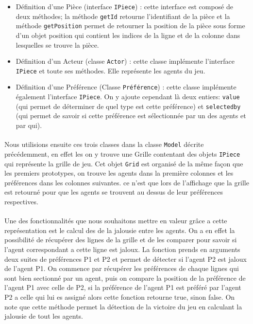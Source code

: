 \documentclass[../main.tex]{subfiles}
\begin{document}
\begin{itemize}
\item Définition d'une Pièce (interface \texttt{IPiece}) : cette interface est composé de deux méthodes; la méthode \texttt{getId} retourne l'identifiant de la pièce et la méthode \texttt{getPosition} permet de retourner la position de la pièce sous forme d'un objet position qui contient les indices de la ligne et de la colonne dans lesquelles se trouve la pièce.
\item Définition d'un Acteur (classe \texttt{Actor}) : cette classe implémente l'interface \texttt{IPiece} et toute ses méthodes. Elle représente les agents du jeu.                                                                                                                                                                                                                                                                                                                                      
\item Définition d'une Préférence (Classe \texttt{Préférence}) : cette classe implémente également l’interface \texttt{IPiece}. On y ajoute cependant là deux entiers: \texttt{value} (qui permet de déterminer de quel type est cette préférence) et \texttt{selectedby} (qui permet de savoir si cette préférence est sélectionnée par un des agents et par qui). 
\end{itemize}

\paragraph{}
Nous utilisions ensuite ces trois classes dans la classe \texttt{Model} décrite précédemment,  en effet les on y trouve une Grille contentant des objets \texttt{IPiece} qui représente la grille de jeu. Cet objet \texttt{Grid} est organisé de la même façon que les premiers prototypes, on trouve les agents dans la première colonnes et les préférences dans les colonnes suivantes. ce n'est que lors de l'affichage que la grille est retourné pour que les agents se trouvent au dessus de leur préférences respectives.
\paragraph{}
Une des fonctionnalités que nous souhaitons mettre en valeur grâce a cette représentation est le calcul des de la jalousie entre les agents. On a en effet la possibilité de récupérer des lignes de la grille et de les comparer pour savoir si l'agent correspondant a cette ligne est jaloux. La fonction prends en arguments deux suites de préférences P1 et P2 et permet de détecter si l'agent P2 est jaloux de l'agent P1. On commence par récupérer les préférences de chaque lignes qui sont bien sectionné par un agent, puis on compare la position de la préférence de l'agent P1 avec celle de P2, si la préférence de l'agent P1 est préféré par l'agent P2 a celle qui lui es assigné alors cette fonction retourne true, sinon false. On note que cette méthode permet la détection de la victoire du jeu en calculant la jalousie de tout les agents.
\end{document}
